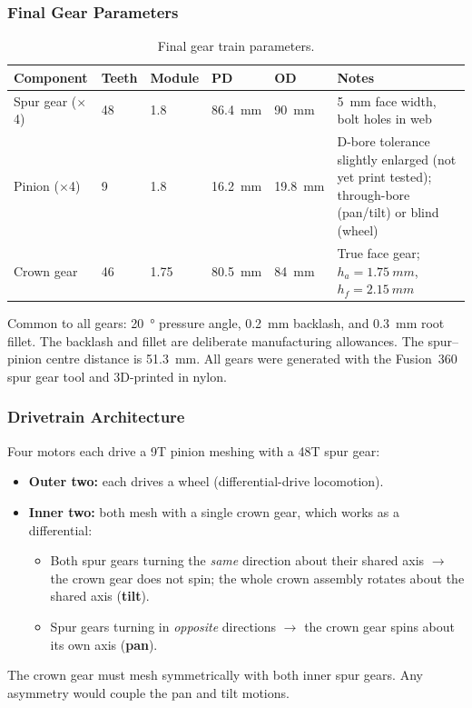 \documentclass[12pt,a4paper]{article}
\begin{document}
\subsubsection{Final Gear Parameters}

\begin{table}[H]
	\centering\small
	\caption{Final gear train parameters.}
	\label{tab:final-params}
	\begin{tabular}{lllllp{4.2cm}}
		\toprule
		\textbf{Component} & \textbf{Teeth} & \textbf{Module} & \textbf{PD} & \textbf{OD} & \textbf{Notes} \\
		\midrule
		Spur gear ($\times$4) & 48 & \num{1.8} & \SI{86.4}{mm} & \SI{90}{mm} &
		\SI{5}{mm} face width, bolt holes in web \\
		\addlinespace
		Pinion ($\times$4) & 9 & \num{1.8} & \SI{16.2}{mm} & \SI{19.8}{mm} &
		D-bore tolerance slightly enlarged (not yet print tested); through-bore
		(pan/tilt) or blind (wheel) \\
		\addlinespace
		Crown gear & 46 & \num{1.75} & \SI{80.5}{mm} & \SI{84}{mm} &
		True face gear; $h_a = \SI{1.75}{mm}$, $h_f = \SI{2.15}{mm}$ \\
		\bottomrule
	\end{tabular}
\end{table}

Common to all gears: \SI{20}{\degree} pressure angle, \SI{0.2}{mm} backlash, and
\SI{0.3}{mm} root fillet. The backlash and fillet are deliberate manufacturing
allowances. The spur--pinion centre distance is \SI{51.3}{mm}. All gears were
generated with the Fusion~360 spur gear tool and 3D-printed in nylon.

\subsubsection{Drivetrain Architecture}

Four motors each drive a 9T pinion meshing with a 48T spur gear:
\begin{itemize}
	\item \textbf{Outer two:} each drives a wheel (differential-drive locomotion).
	\item \textbf{Inner two:} both mesh with a single crown gear, which works as a
	      differential:
	      \begin{itemize}
	      	\item Both spur gears turning the \emph{same} direction about their
	      	      shared axis $\rightarrow$ the crown gear does not spin; the whole
	      	      crown assembly rotates about the shared axis (\textbf{tilt}).
	      	\item Spur gears turning in \emph{opposite} directions $\rightarrow$
	      	      the crown gear spins about its own axis (\textbf{pan}).
	      \end{itemize}
\end{itemize}
The crown gear must mesh symmetrically with both inner spur gears. Any
asymmetry would couple the pan and tilt motions.
\end{document}
